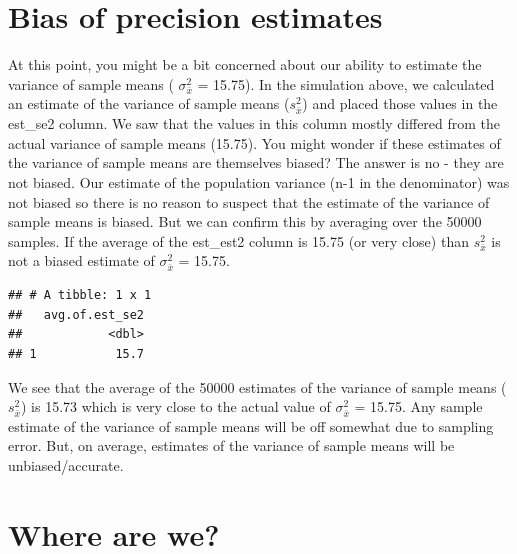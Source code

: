 \documentclass[
]{krantz}
\makeatletter
\newenvironment{Shaded}{\begin{snugshade}}{\end{snugshade}}
\newcommand{\DataTypeTok}[1]{\textcolor[rgb]{0.27,0.27,0.27}{#1}}
\newcommand{\KeywordTok}[1]{\textcolor[rgb]{0.27,0.27,0.27}{\textbf{#1}}}
\newcommand{\NormalTok}[1]{#1}
\newcommand{\OperatorTok}[1]{\textcolor[rgb]{0.43,0.43,0.43}{\textbf{#1}}}
\newcommand{\StringTok}[1]{\textcolor[rgb]{0.5,0.5,0.5}{#1}}
\newenvironment{kframe}{%
\medskip{}
\setlength{\fboxsep}{.8em}
 \def\at@end@of@kframe{}%
 \ifinner\ifhmode%
  \def\at@end@of@kframe{\end{minipage}}%
  \begin{minipage}{\columnwidth}%
 \fi\fi%
 \def\FrameCommand##1{\hskip\@totalleftmargin \hskip-\fboxsep
 \colorbox{shadecolor}{##1}\hskip-\fboxsep
     \hskip-\linewidth \hskip-\@totalleftmargin \hskip\columnwidth}%
 \MakeFramed {\advance\hsize-\width
   \@totalleftmargin\z@ \linewidth\hsize
   \@setminipage}}%
 {\par\unskip\endMakeFramed%
 \at@end@of@kframe}
\renewenvironment{Shaded}{\begin{kframe}}{\end{kframe}}
\makeatother
\begin{document}
\hypertarget{bias-of-precision-estimates}{%
\section{Bias of precision estimates}\label{bias-of-precision-estimates}}

At this point, you might be a bit concerned about our ability to estimate the variance of sample means ( \(\sigma_{\bar{x}}^2\) = 15.75). In the simulation above, we calculated an estimate of the variance of sample means (\(s_{\bar{x}}^2\)) and placed those values in the est\_se2 column. We saw that the values in this column mostly differed from the actual variance of sample means (15.75). You might wonder if these estimates of the variance of sample means are themselves biased? The answer is no - they are not biased. Our estimate of the population variance (n-1 in the denominator) was not biased so there is no reason to suspect that the estimate of the variance of sample means is biased. But we can confirm this by averaging over the 50000 samples. If the average of the est\_est2 column is 15.75 (or very close) than \(s_{\bar{x}}^2\) is not a biased estimate of \(\sigma_{\bar{x}}^2\) = 15.75.

\begin{Shaded}
\end{Shaded}

\begin{verbatim}
## # A tibble: 1 x 1
##   avg.of.est_se2
##            <dbl>
## 1           15.7
\end{verbatim}

We see that the average of the 50000 estimates of the variance of sample means (\(s_{\bar{x}}^2\)) is 15.73 which is very close to the actual value of \(\sigma_{\bar{x}}^2\) = 15.75. Any sample estimate of the variance of sample means will be off somewhat due to sampling error. But, on average, estimates of the variance of sample means will be unbiased/accurate.

\hypertarget{where-are-we}{%
\section{Where are we?}\label{where-are-we}}
\end{document}
